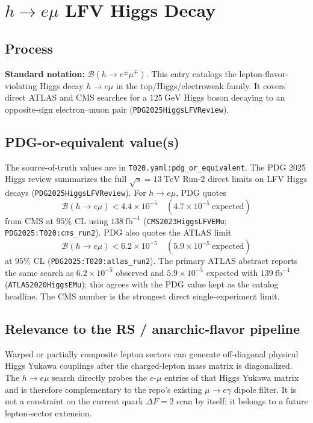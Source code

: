
\section{\texorpdfstring{\(h\to e\mu\)}{h -> e mu} LFV Higgs Decay}

\subsection*{Process}
\textbf{Standard notation:} \(\mathcal{B}(h\to e^\pm\mu^\mp)\).
This entry catalogs the lepton-flavor-violating Higgs decay \(h\to e\mu\)
in the top/Higgs/electroweak family.  It covers direct ATLAS and CMS searches
for a \(125~\mathrm{GeV}\) Higgs boson decaying to an opposite-sign
electron--muon pair (\texttt{PDG2025HiggsLFVReview}).

\subsection*{PDG-or-equivalent value(s)}
The source-of-truth values are in \texttt{T020.yaml:pdg\_or\_equivalent}.  The
PDG 2025 Higgs review summarizes the full \(\sqrt{s}=13~\mathrm{TeV}\) Run-2
direct limits on LFV Higgs decays (\texttt{PDG2025HiggsLFVReview}).  For
\(h\to e\mu\), PDG quotes
\[
  \mathcal{B}(h\to e\mu) < 4.4\times 10^{-5}
  \quad (4.7\times 10^{-5}\ \mathrm{expected})
\]
from CMS at \(95\%\) CL using \(138~\mathrm{fb}^{-1}\)
(\texttt{CMS2023HiggsLFVEMu}; \texttt{PDG2025:T020:cms\_run2}).  PDG also
quotes the ATLAS limit
\[
  \mathcal{B}(h\to e\mu) < 6.2\times 10^{-5}
  \quad (5.9\times 10^{-5}\ \mathrm{expected})
\]
at \(95\%\) CL (\texttt{PDG2025:T020:atlas\_run2}).  The primary ATLAS abstract
reports the same search as \(6.2\times10^{-5}\) observed and
\(5.9\times10^{-5}\) expected with \(139~\mathrm{fb}^{-1}\)
(\texttt{ATLAS2020HiggsEMu}); this agrees with the PDG value kept as the
catalog headline.  The CMS number is the strongest direct single-experiment
limit.

\subsection*{Relevance to the RS / anarchic-flavor pipeline}
Warped or partially composite lepton sectors can generate off-diagonal
physical Higgs Yukawa couplings after the charged-lepton mass matrix is
diagonalized.  The \(h\to e\mu\) search directly probes the \(e\)-\(\mu\)
entries of that Higgs Yukawa matrix and is therefore complementary to the
repo's existing \(\mu\to e\gamma\) dipole filter.  It is not a constraint on
the current quark \(\Delta F=2\) scan by itself; it belongs to a future
lepton-sector extension.

